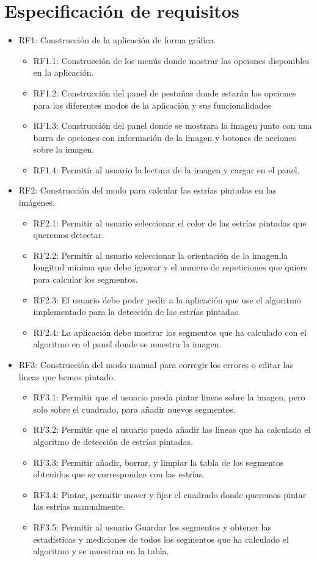 \section{Especificación de requisitos}
\begin{itemize}
	 
\item RF1: Construcción de la aplicación de forma gráfica.
	\begin{itemize}
		\item RF1.1: Construcción de los menús donde mostrar las opciones disponibles en la aplicación.
		\item RF1.2: Construcción del panel de pestañas donde estarán las opciones para los diferentes modos de la aplicación y sus funcionalidades
		\item RF1.3: Construcción del panel donde se mostrara la imagen junto con una barra de opciones con información de la imagen y botones de acciones sobre la imagen.
		\item RF1.4: Permitir al usuario la lectura de la imagen y cargar en el panel.
	\end{itemize}

\item RF2: Construcción del modo para calcular las estrías pintadas en las imágenes.
	\begin{itemize}
		\item RF2.1: Permitir al usuario seleccionar el color de las estrías pintadas que queremos detectar.
		\item RF2.2: Permitir al usuario seleccionar la orientación de la imagen,la longitud mínima que debe ignorar y el numero de repeticiones que quiere para calcular los segmentos.
		\item RF2.3: El usuario debe poder pedir a la aplicación que use el algoritmo implementado para la detección de las estrías pintadas.			 
		\item RF2.4: La aplicación debe mostrar los segmentos que ha calculado con el algoritmo en el panel donde se muestra la imagen.
	\end{itemize}

\item RF3: Construcción del modo manual para corregir los errores o editar las lineas que hemos pintado.
	\begin{itemize}
		\item RF3.1: Permitir que el usuario pueda pintar lineas sobre la imagen, pero solo sobre el cuadrado, para añadir nuevos segmentos.
		\item RF3.2: Permitir que el usuario pueda añadir las lineas que ha calculado el algoritmo de detección de estrías pintadas.
		\item RF3.3: Permitir añadir, borrar, y limpiar la tabla de los segmentos obtenidos que se corresponden con las estrías.
		\item RF3.4: Pintar, permitir mover y fijar el cuadrado donde queremos pintar las estrías manualmente.
		\item RF3.5: Permitir al usuario Guardar los segmentos y obtener las estadísticas y mediciones de todos los segmentos que ha calculado el algoritmo y se muestran en la tabla.			
	\end{itemize}
			 

\end{itemize}
